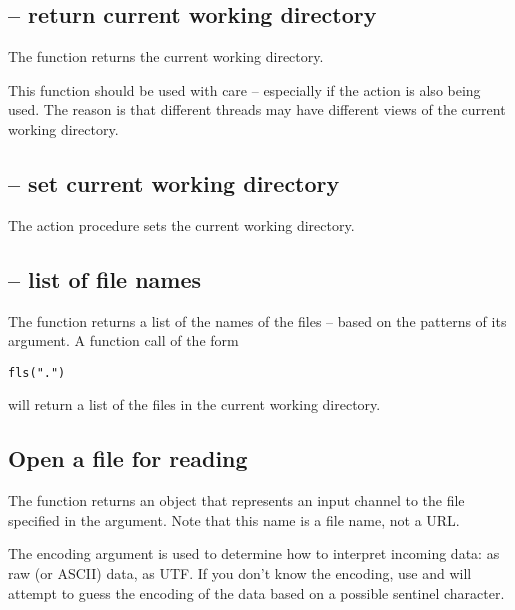 \subsection{ -- return current working directory}
\label{io:cwd}
The  function returns the current working directory.

\begin{aside}
This function should be used with care -- especially if the  action is also being used. The reason is that different threads may have different views of the current working directory.
\end{aside}

\subsection{ -- set current working directory}
\label{io:cd}
The  action procedure sets the current working directory.

\subsection{ -- list of file names}
\label{io:ls}
The  function returns a list of the names of the files -- based on the patterns of its argument. A function call of the form 
\begin{alltt}
fls(".")
\end{alltt}
will return a list of the files in the current working directory.

           
\subsection{Open a file for reading}
\label{io:openInFile}


The  function returns an  object that represents an input channel to the file specified in the argument. Note that this name is a file name, not a URL.

The encoding argument is used to determine how to interpret incoming data: as raw (or ASCII) data, as UTF. If you don't know the encoding, use  and \go will attempt to guess the encoding of the data based on a possible sentinel character.

